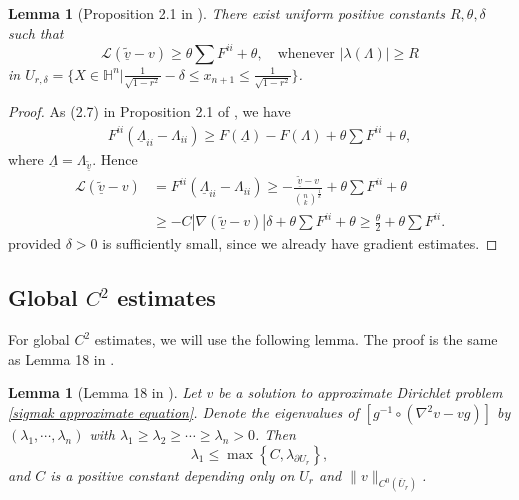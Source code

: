\documentclass[reqno]{amsart}
\newtheorem{lemma}[theorem]{Lemma}
\theoremstyle{remark}
\theoremstyle{definition}
\numberwithin{equation}{section}
\begin{document}
\begin{lemma}[Proposition 2.1 in \cite{GuanJiao}]
    There exist uniform positive constants $R, \theta, \delta$ such that
    \[
    \mathscr{L}\left( \tilde{\underline{v}} - v \right) \geqslant \theta \sum F^{ii} + \theta, \quad \text{whenever } |\lambda(\Lambda)| \geqslant R
    \]
    in $U_{r,\delta} = \{X \in \mathbb{H}^n | \frac{1}{\sqrt{1-r^2}} - \delta \leqslant x_{n+1} \leqslant \frac{1}{\sqrt{1-r^2}}\}$.
\end{lemma}
\begin{proof}
    As (2.7) in Proposition 2.1 of \cite{GuanJiao}, we have
    \begin{align}
        F^{ii}(\underline{\Lambda}_{ii} - \Lambda_{ii}) \geqslant F(\underline{\Lambda}) - F(\Lambda) + \theta\sum F^{ii} + \theta,
    \end{align}
    where $\underline{\Lambda} = \Lambda_{\tilde{\underline{v}}}$. Hence
    \begin{align*}
        \mathscr{L}\left( \tilde{\underline{v}} - v \right) &= 
        F^{ii}(\underline{\Lambda}_{ii} - \Lambda_{ii}) 
        \geqslant - \frac{\tilde{\underline{v}} - v}{\binom{n}{k}^{\frac{1}{k}}} + \theta\sum F^{ii} + \theta \\
        &\geqslant -C|\nabla (\tilde{\underline{v}} - v)|\delta + \theta\sum F^{ii} + \theta \geqslant \frac{\theta}{2} + \theta\sum F^{ii}.
    \end{align*}
    provided $\delta>0$ is sufficiently small, since we already have gradient estimates.
\end{proof}


\subsection{Global \texorpdfstring{$C^2$}{C2} estimates}

For global $C^2$ estimates, we will use the following lemma. The proof is the same as Lemma 18 in \cite{Entireself-expanders}.

\begin{lemma}[Lemma 18 in \cite{Entireself-expanders}]\label{C2 global estimates for selfshrinker}
    Let $v$ be a solution to approximate Dirichlet problem \eqref{sigmak approximate equation}. Denote the eigenvalues of $\left[ g^{-1} \circ \left( \nabla^2 v - vg \right) \right]$ by $(\lambda_1, \cdots, \lambda_n)$ with $\lambda_1 \geqslant \lambda_2 \geqslant \cdots \geqslant \lambda_n > 0$. Then 
    \[
    \lambda_1 \leqslant \max\left\{ C, \lambda_{\partial U_r} \right\},
    \]
    and $C$ is a positive constant depending only on $U_r$ and $\| v \|_{C^0(\overline{U}_r)}$.
\end{lemma}
\end{document}
